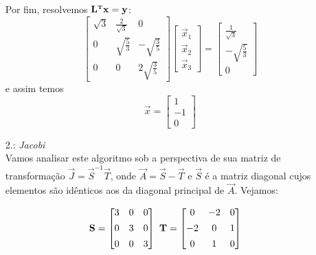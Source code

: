 \documentclass{homework}
\begin{document}
\begin{enumerate}[wide, leftmargin=80pt]
			Por fim, resolvemos $\mathbf{L}^{\text{\bfseries\tiny T}} \mathbf{x} = \mathbf{y}$:
			$$\begin{bmatrix}
			\sqrt{3} & \frac{2}{\sqrt{3}}& 0\\
			0 & \sqrt {\frac{5}{3}} & - \sqrt {\frac{3}{5}}\\
			0 & 0 & 2\sqrt {\frac{3}{5}}
			\end{bmatrix} \begin{bmatrix}
			\vec{x}_1\\
			\vec{x}_2\\
			\vec{x}_3
			\end{bmatrix} = \begin{bmatrix}
			\frac{1}{\sqrt{3}}\\
			-\sqrt{\frac{5}{3}}\\
			0
			\end{bmatrix}
			$$
			e assim temos $$\vec{x} = \begin{bmatrix}
			1\\
			-1\\
			0
			\end{bmatrix}$$
			
			\item[2.: \textit{Jacobi}]~\\
			
			Vamos analisar este algoritmo sob a perspectiva de sua matriz de transformação $\vec{J} = \vec{S}^{-1}\vec{T}$, onde $\vec{A} = \vec{S} - \vec{T}$ e $\vec{S}$ é a matriz diagonal cujos elementos são idênticos aos da diagonal principal de $\vec{A}$. Vejamos:\par
			
			\begin{align*}\vec{S} &= \left[
			\begin{array}{@{}ccc@{}}
			3 & 0 & 0 \\[1ex]
			0 & 3 & 0 \\[1ex]
			0 & 0 & 3 
			\end{array}
			\right]
			~%
			\vec{T} = \left[
			\begin{array}{@{}ccc@{}}
			0 & -2 & 0 \\[1ex]
			-2 & 0 & 1 \\[1ex]
			0 & 1 & 0
			\end{array}
			\right]
			\end{align*}
			

\end{enumerate}
\end{document}
